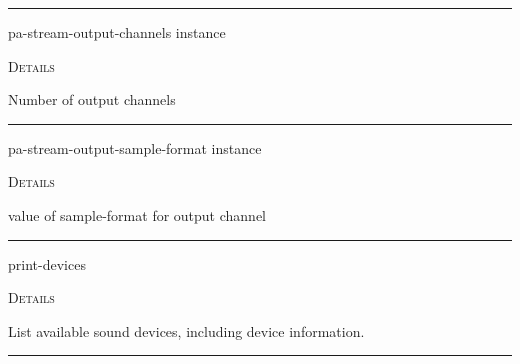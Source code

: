\documentclass[a4paper]{report}
\begin{document}
  

    \rule{\linewidth}{0.1mm}
    
    \label{portaudio__fun__pa-stream-output-channels}
    \begin{defun}[Function]
    pa-stream-output-channels instance


	
    \bigskip
    \textsc{Details}

Number of output channels


    
    \end{defun}
  
  

    \rule{\linewidth}{0.1mm}
    
    \label{portaudio__fun__pa-stream-output-sample-format}
    \begin{defun}[Function]
    pa-stream-output-sample-format instance


	
    \bigskip
    \textsc{Details}

value of sample-format for output channel


    
    \end{defun}
  
  

    \rule{\linewidth}{0.1mm}
    
    \label{portaudio__fun__print-devices}
    \begin{defun}[Function]
    print-devices


	
    \bigskip
    \textsc{Details}

List available sound devices, including device information.


    
    \end{defun}
  
  

    \rule{\linewidth}{0.1mm}
    
\end{document}
